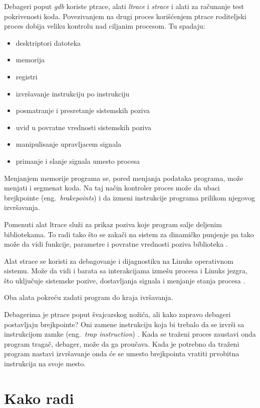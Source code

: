 \documentclass[a4paper]{article}
\begin{document}
Debageri poput \emph{gdb} koriste ptrace, alati \emph{ltrace} i \emph{strace} i alati za računanje test pokrivenosti koda.
Povezivanjem na drugi proces korišćenjem ptrace roditeljski proces dobija veliku kontrolu nad ciljanim procesom.
Tu spadaju:
\begin{itemize}
    \item desktriptori datoteka
    \item memorija
    \item registri
    \item izvršavanje instrukciju po instrukciju
    \item posmatranje i presretanje sistemskih poziva
    \item uvid u povratne vrednosti sistemskih poziva
    \item manipulisanje upravljacem signala
    \item primanje i slanje signala umesto procesa
\end{itemize}

Menjanjem memorije programa se, pored menjanja podataka programa, može menjati i segmenat koda. 
Na taj način kontroler proces može da ubaci brejkpointe  (eng.~{\em brakepoints}) i da izmeni instrukcije 
programa prilikom njegovog izvršavanja.

Pomenuti alat ltrace služi za prikaz poziva koje program salje deljenim bibliotekama. To radi tako što se zakači na sistem
za dinamičko punjenje pa tako može da vidi funkcije, parametre i povratne vrednosti poziva biblioteka \cite{lman}.

Alat strace se koristi za debagovanje i dijagnostiku na Linuks operativnom sistemu. 
Može da vidi i barata sa interakcijama izmešu procesa i Linuks jezgra, što uključuje sistemske pozive, dostavljanja signala 
i menjanje stanja procesa \cite{sman}.

Oba alata pokreću zadati program do kraja ivršavanja.

Debagerima je ptrace poput švajcarskog nožića, ali kako zapravo debageri postavljaju brejkpointe? 
Oni zamene instrukciju koja bi trebalo da se izvrši sa instrukcijom zamke 
(eng.~{\em trap instruction}) \cite{journal}. Kada se traženi proces zaustavi onda program tragač, debager, može da
ga proučava. Kada je potrebno da traženi program nastavi izvršavanje onda će se umesto brejkpointa vratiti 
prvobitna instrukcija na svoje mesto.

\section{Kako radi}
\end{document}
